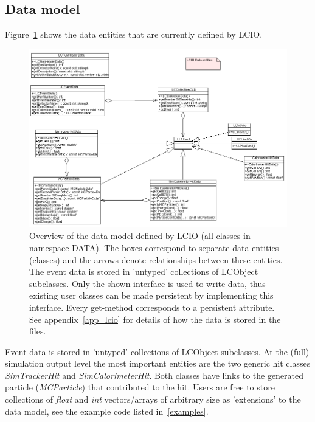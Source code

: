 \documentclass[twoside]{article}
\begin{document}
\subsection{Data model \label{sec_datamodel}}

Figure~\ref{fig_datamodel} shows the data entities that are currently defined by LCIO. 
\begin{figure}
\includegraphics[width=150mm]{datamodel}    
\caption{Overview of the data model defined by LCIO (all classes in namespace DATA). 
The boxes correspond to separate
data entities (classes) and the arrows denote relationships between these entities.
The event data is stored in 'untyped' collections of LCObject subclasses.
Only the shown interface is used to write data, thus existing user classes can be made persistent 
by implementing this interface.  Every get-method
corresponds to a persistent attribute. 
See  appendix~\ref{app_lcio} for details of how the data is stored in the files.\label{fig_datamodel}
}
\end{figure}


Event data is stored in 'untyped' collections of LCObject subclasses. At the (full) simulation
output level the most important entities are the two generic hit classes {\em SimTrackerHit} and 
{\em SimCalorimeterHit}. Both classes have links to the generated particle ({\em MCParticle}) that 
contributed to the hit.
Users are free to store collections of {\em float} and {\em int} vectors/arrays of arbitrary size
as 'extensions' to the data model, see the example code listed in~\ref{examples}.
\end{document}
